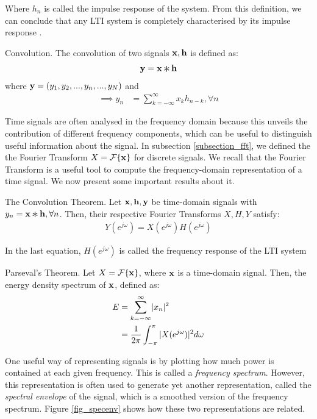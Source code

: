 \documentclass[../main.tex]{subfiles}
\begin{document}
\par Where $h_{n}$ is called the impulse response of the system. From this definition, we can conclude that any LTI system is completely characterised by its impulse response \cite{Oppenheim2010}.  
\begin{definition}{Convolution.} \label{def_convolution}
The convolution of two signals $\mathbf{x, h}$ is defined as:
\begin{align*}
\V{y} &= \V{x} \Conv \V{h}\\
\end{align*}
where $\mathbf{y} = (y_1, y_2, ..., y_n, ..., y_N)$ and
\begin{align*}
\implies y_n &= \sum_{k=-\infty}^{\infty}x_kh_{n-k}, \forall n
\end{align*}
\end{definition}
\par Time signals are often analysed in the frequency domain because this unveils the contribution of different frequency components, which can be useful to distinguish useful information about the signal. In subsection \ref{subsection_fft}, we defined the the Fourier Transform $X = \mathcal{F}\{\mathbf{x}\}$ for discrete signals. We recall that the Fourier Transform is a useful tool to compute the frequency-domain representation of a time signal. We now present some important results about it.
\begin{theorem}{The Convolution Theorem.} \label{theo_conv}
Let $\mathbf{x, h, y}$ be time-domain signals with $y_n = \V{x}\Conv\V{h}, \forall n$. Then, their respective Fourier Transforms $X, H, Y$ satisfy:
\begin{align*}
Y(e^{j\omega}) = X(e^{j\omega})H(e^{j\omega})
\end{align*}
\end{theorem}
\par In the last equation, $H(e^{j\omega})$ is called the frequency response of the LTI system
\begin{theorem}{Parseval's Theorem.} \label{theo_parseval}
Let $X = \mathcal{F}\{\mathbf{x}\}$, where $\mathbf{x}$ is a time-domain signal. Then, the energy density spectrum of $\mathbf{x}$, defined as:
\begin{align*}
E &= \sum_{k=-\infty}^{\infty}\lvert x_n\rvert^2\\
&= \frac{1}{2\pi}\int_{-\pi}^\pi{\lvert X(e^{j\omega})\rvert^2d\omega}
\end{align*}
\end{theorem}
\par One useful way of representing signals is by plotting how much power is contained at each given frequency. This is called a \emph{frequency spectrum}. However, this representation is often used to generate yet another representation, called the \emph{spectral envelope} of the signal, which is a smoothed version of the frequency spectrum. Figure \ref{fig_specenv} shows how these two representations are related.
\end{document}
